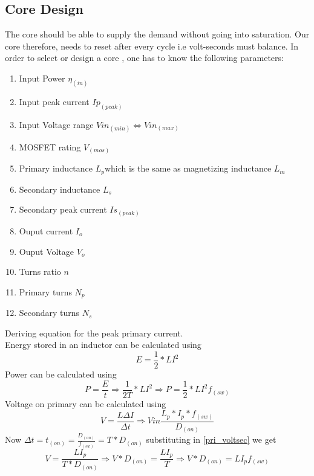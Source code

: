 \documentclass{article}
\begin{document}
\subsection[Core Design]{Core Design}
The core should be able to supply the demand without going into saturation. Our core therefore, needs to reset after every cycle i.e volt-seconds must balance. In order to select or design a core , one has to know the following parameters:
\\
\begin{enumerate}
    \item Input Power $\eta_(in)$
    \item Input peak current $Ip_(peak)$
    \item Input Voltage range $Vin_(min) \Leftrightarrow Vin_(max)$
    \item MOSFET rating $V_(mos)$
    \item Primary inductance $L_p$which is the same as magnetizing inductance $L_m$
    \item Secondary inductance $L_s$
    \item Secondary peak current $Is_(peak)$
    \item Ouput current $I_o$
    \item Ouput Voltage $V_o$
    \item Turns ratio $n$
    \item Primary turns $N_p$
    \item Secondary turns $N_s$
    
\end{enumerate}
Deriving equation for the peak primary current.
\\
Energy stored in an inductor can be calculated using \begin{equation} \label{inductorenergy}
    E = \frac{1}{2}* LI^2
\end{equation}
Power can be calculated using \begin{equation} \label{powerequation}
    P = \frac{E}{t} \Longrightarrow \frac{1}{2T} * LI^2 \Longrightarrow P=\frac{1}{2} * LI^2 f_(sw)
\end{equation}
Voltage on primary can be calculated using \begin{equation} \label{pri_voltsec}
    V = \frac{L\Delta I}{\Delta t} \Longrightarrow Vin\frac{L_p*I_p * f_(sw)}{D_(on)}
\end{equation}
Now $\Delta t = t_(on) = \frac{D_(on)}{f_(sw)} = T*D_(on)$ substituting in \ref{pri_voltsec} we get \begin{equation}
    V = \frac{LI_p}{T*D_(on)} \Longrightarrow V*D_(on) =\frac{LI_p}{T} \Longrightarrow V*D_(on) = LI_p f_(sw)
\end{equation}
\end{document}
